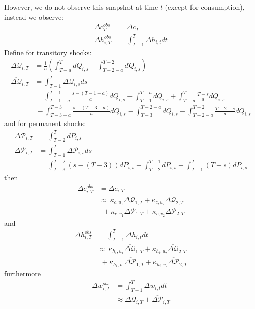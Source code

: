 \documentclass[]{article}
\begin{document}
However, we do not observe this snapshot at time $t$ (except for consumption), instead we observe:
\begin{align*}
\Delta c^{obs}_T & = \Delta c_T \\
\Delta h^{obs}_{i,T} & = \int_{T-1}^T \Delta h_{i,t} dt
\end{align*}
Define for transitory shocks:
\begin{align*}
\Delta \mathcal{Q}_{i,T} &=  \frac{1}{a}\left( \int_{T-a}^T dQ_{i,s}  -  \int_{T-2-a}^{T-2} dQ_{i,s} \right)\\
\overline{\Delta \mathcal{Q}}_{i,T} &= \int_{T-1}^T \Delta \mathcal{Q}_{i,s} ds \\
&=  \int_{T-1-a}^{T-1}\frac{ s-(T-1-a) }{a} dQ_{i,s} +  \int_{T-1}^{T-a} dQ_{i,s} +  \int_{T-a}^T \frac{T-s}{a} dQ_{i,s} \\
& \ - \int_{T-3-a}^{T-3}\frac{ s-(T-3-a) }{a} dQ_{i,s} -  \int_{T-3}^{T-2-a} dQ_{i,s} -  \int_{T-2-a}^{T-2} \frac{T-2-s}{a} dQ_{i,s} 
\end{align*}
and for permanent shocks:
\begin{align*}
\Delta \mathcal{P}_{i,T} &=  \int_{T-2}^T dP_{i,s}  \\
\overline{\Delta \mathcal{P}}_{i,T} &=   \int_{T-1}^T \Delta \mathcal{P}_{i,s} ds \\
&= \int_{T-3}^{T-2} (s-(T-3))dP_{i,s} + \int_{T-2}^{T-1} dP_{i,s}  + \int_{T-1}^{T} (T-s)dP_{i,s} 
\end{align*}
then
\begin{align*}
\Delta c^{obs}_{i,T} & = \Delta c_{i,T}  \\
 &  \approx \ \kappa_{c, u_1}\Delta \mathcal{Q}_{1,T} 
 + \kappa_{c, u_2}\Delta \mathcal{Q}_{2,T} \\
& \ \ + \kappa_{c, v_1}\Delta \mathcal{P}_{1,T}
+ \kappa_{c, v_2}\Delta \mathcal{P}_{2,T}
\end{align*}
and
\begin{align*}
\Delta h^{obs}_{i,T} & = \int_{T-1}^T \Delta h_{i,t} dt \\
 &  \approx \ \kappa_{h_i, u_1}\overline{\Delta \mathcal{Q}}_{1,T} 
 + \kappa_{h_i, u_2}\overline{\Delta \mathcal{Q}}_{2,T} \\
& \ \ + \kappa_{h_i, v_1}\overline{\Delta \mathcal{P}}_{1,T}
+ \kappa_{h_i, v_2}\overline{\Delta \mathcal{P}}_{2,T}
\end{align*}
furthermore
\begin{align*}
\Delta w^{obs}_{i,T} & = \int_{T-1}^T \Delta w_{i,t} dt \\
 &  \approx \overline{\Delta \mathcal{Q}}_{i,T} 
+ \overline{\Delta \mathcal{P}}_{i,T}
\end{align*}
\end{document}
